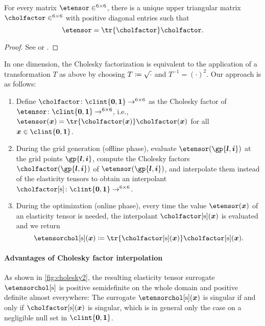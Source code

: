 \begin{proposition}
  For every \spd matrix $\etensor \in \real^{6 \times 6}$,
  there is a unique upper triangular matrix
  $\cholfactor \in \real^{6 \times 6}$
  with positive diagonal entries such that
  \begin{equation}
    \etensor
    = \tr{\cholfactor} \cholfactor.
  \end{equation}
\end{proposition}

\begin{proof}
  See \cite{Benoit24Note} or \cite{Freund07Stoer}.
\end{proof}

In one dimension, the Cholesky factorization is equivalent
to the application of a transformation $T$ as above by choosing
$T \coloneqq \sqrt{\cdot}$ and $T^{-1} = (\cdot)^2$.
Our approach is as follows:
\begin{enumerate}
  \item
  Define $\cholfactor\colon \clint{\*0, \*1} \to \real^{6 \times 6}$
  as the Cholesky factor of
  $\etensor\colon \clint{\*0, \*1} \to \real^{6 \times 6}$, i.e.,
  $\etensor(\*x) = \tr{\cholfactor(\*x)} \cholfactor(\*x)$
  for all $\*x \in \clint{\*0, \*1}$.
  
  \item
  During the grid generation (offline phase),
  evaluate $\etensor(\gp{\*l,\*i})$ at the grid points $\gp{\*l,\*i}$,
  compute the Cholesky factors $\cholfactor(\gp{\*l,\*i})$ of
  $\etensor(\gp{\*l,\*i})$,
  and interpolate them instead of the elasticity tensors
  to obtain an interpolant
  $\cholfactorintp\colon \clint{\*0, \*1} \to \real^{6 \times 6}$.
  
  \item
  During the optimization (online phase),
  every time the value $\etensor(\*x)$ of an elasticity tensor is needed,
  the interpolant $\cholfactorintp(\*x)$ is evaluated and we return
  \begin{equation}
    \etensorcholintp(\*x)
    \ceq \tr{\cholfactorintp(\*x)} \cholfactorintp(\*x).
  \end{equation}
\end{enumerate}

\paragraph{Advantages of Cholesky factor interpolation}

As shown in \cref{fig:cholesky2},
the resulting elasticity tensor surrogate $\etensorcholintp$
is positive semidefinite on the whole domain and
positive definite almost everywhere:
The surrogate $\etensorcholintp(\*x)$ is singular if and only if
$\cholfactorintp(\*x)$ is singular, which is in general
only the case on a negligible null set in $\clint{\*0, \*1}$.

